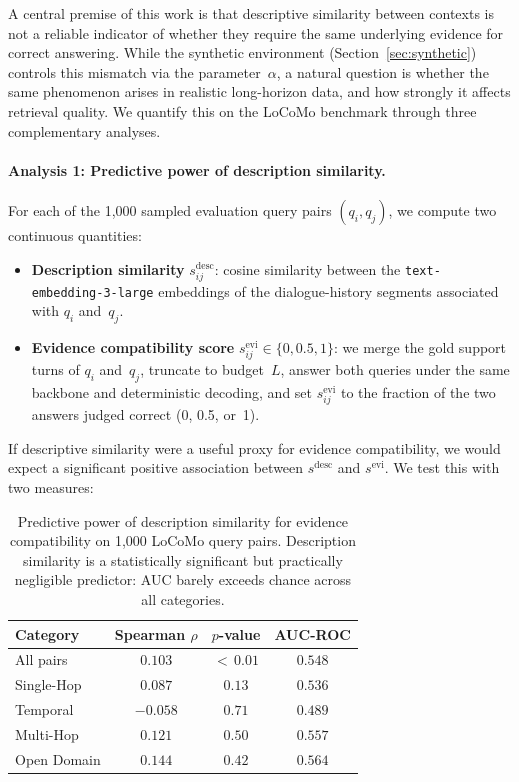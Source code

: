 \documentclass{article}
\theoremstyle{plain}
\theoremstyle{definition}
\theoremstyle{remark}
\begin{document}
A central premise of this work is that descriptive similarity between
contexts is not a reliable indicator of whether they require the same
underlying evidence for correct answering. While the synthetic
environment (Section~\ref{sec:synthetic}) controls this mismatch via
the parameter~$\alpha$, a natural question is whether the same
phenomenon arises in realistic long-horizon data, and how strongly it
affects retrieval quality. We quantify this on the LoCoMo benchmark
through three complementary analyses.

\paragraph{Analysis 1: Predictive power of description similarity.}

For each of the 1{,}000 sampled evaluation query pairs $(q_i, q_j)$,
we compute two continuous quantities:
\begin{itemize}[leftmargin=1.5em,itemsep=2pt]
\item \textbf{Description similarity} $s^{\mathrm{desc}}_{ij}$:
  cosine similarity between the \texttt{text-embedding-3-large}
  embeddings of the dialogue-history segments associated with
  $q_i$ and~$q_j$.
\item \textbf{Evidence compatibility score} $s^{\mathrm{evi}}_{ij}
  \in \{0, 0.5, 1\}$: we merge the gold support turns of $q_i$
  and~$q_j$, truncate to budget~$L$, answer both queries under the
  same backbone and deterministic decoding, and set
  $s^{\mathrm{evi}}_{ij}$ to the fraction of the two answers judged
  correct (0, 0.5, or~1).
\end{itemize}

\noindent
If descriptive similarity were a useful proxy for evidence
compatibility, we would expect a significant positive association
between $s^{\mathrm{desc}}$ and $s^{\mathrm{evi}}$. We test this
with two measures:


\begin{table}[h]
\centering
\caption{Predictive power of description similarity for evidence
  compatibility on 1{,}000 LoCoMo query pairs. Description similarity
  is a statistically significant but practically negligible predictor:
  AUC barely exceeds chance across all categories.}
\label{tab:mismatch-predictive}
\small
\begin{tabular}{lccc}
\toprule
Category & Spearman $\rho$ & $p$-value & AUC-ROC \\
\midrule
All pairs    & $0.103$  & ${<}\,0.01$ & $0.548$ \\
\midrule
Single-Hop   & $0.087$  & $0.13$  & $0.536$ \\
Temporal      & $-0.058$ & $0.71$  & $0.489$ \\
Multi-Hop     & $0.121$  & $0.50$  & $0.557$ \\
Open Domain   & $0.144$  & $0.42$  & $0.564$ \\
\bottomrule
\end{tabular}
\end{table}
\end{document}
